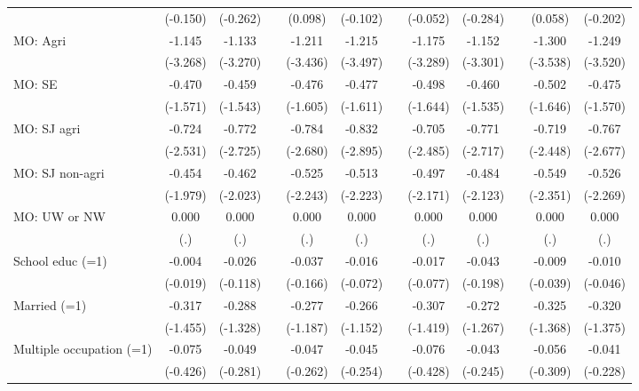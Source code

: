 {\begin{longtable}{@{\extracolsep{\fill}}lccccccccccc}
          & (-0.150) & (-0.262) &       & (0.098) & (-0.102) &       & (-0.052) & (-0.284) &       & (0.058) & (-0.202) \\
    MO: Agri & -1.145 & -1.133 &       & -1.211 & -1.215 &       & -1.175 & -1.152 &       & -1.300 & -1.249 \\
          & (-3.268) & (-3.270) &       & (-3.436) & (-3.497) &       & (-3.289) & (-3.301) &       & (-3.538) & (-3.520) \\
    MO: SE & -0.470 & -0.459 &       & -0.476 & -0.477 &       & -0.498 & -0.460 &       & -0.502 & -0.475 \\
          & (-1.571) & (-1.543) &       & (-1.605) & (-1.611) &       & (-1.644) & (-1.535) &       & (-1.646) & (-1.570) \\
    MO: SJ agri & -0.724 & -0.772 &       & -0.784 & -0.832 &       & -0.705 & -0.771 &       & -0.719 & -0.767 \\
          & (-2.531) & (-2.725) &       & (-2.680) & (-2.895) &       & (-2.485) & (-2.717) &       & (-2.448) & (-2.677) \\
    MO: SJ non-agri & -0.454 & -0.462 &       & -0.525 & -0.513 &       & -0.497 & -0.484 &       & -0.549 & -0.526 \\
          & (-1.979) & (-2.023) &       & (-2.243) & (-2.223) &       & (-2.171) & (-2.123) &       & (-2.351) & (-2.269) \\
    MO: UW or NW & 0.000 & 0.000 &       & 0.000 & 0.000 &       & 0.000 & 0.000 &       & 0.000 & 0.000 \\
          & (.)   & (.)   &       & (.)   & (.)   &       & (.)   & (.)   &       & (.)   & (.) \\
    School educ (=1) & -0.004 & -0.026 &       & -0.037 & -0.016 &       & -0.017 & -0.043 &       & -0.009 & -0.010 \\
          & (-0.019) & (-0.118) &       & (-0.166) & (-0.072) &       & (-0.077) & (-0.198) &       & (-0.039) & (-0.046) \\
    Married (=1) & -0.317 & -0.288 &       & -0.277 & -0.266 &       & -0.307 & -0.272 &       & -0.325 & -0.320 \\
          & (-1.455) & (-1.328) &       & (-1.187) & (-1.152) &       & (-1.419) & (-1.267) &       & (-1.368) & (-1.375) \\
    Multiple occupation (=1) & -0.075 & -0.049 &       & -0.047 & -0.045 &       & -0.076 & -0.043 &       & -0.056 & -0.041 \\
          & (-0.426) & (-0.281) &       & (-0.262) & (-0.254) &       & (-0.428) & (-0.245) &       & (-0.309) & (-0.228) \\

\end{longtable}}
